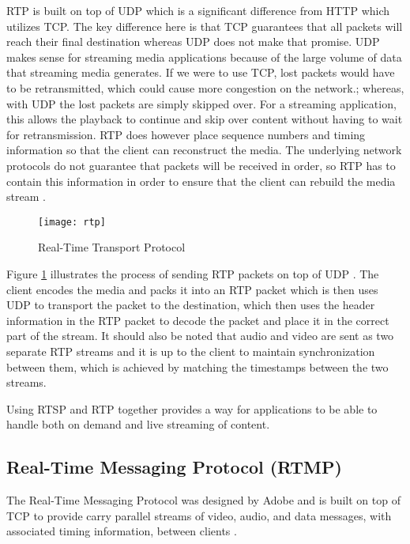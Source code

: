 \documentclass[12pt]{article}
\begin{document}
RTP is built on top of UDP which is a significant difference from HTTP which utilizes TCP.  The key difference here is that TCP guarantees that all packets will reach their final destination whereas UDP does not make that promise.  UDP makes sense for streaming media applications because of the large volume of data that streaming media generates.  If we were to use TCP, lost packets would have to be retransmitted, which could cause more congestion on the network.; whereas, with UDP the lost packets are simply skipped over.  For a streaming application, this allows the playback to continue and skip over content without having to wait for retransmission.  RTP does however place sequence numbers and timing information so that the client can reconstruct the media.  The underlying network protocols do not guarantee that packets will be received in order, so RTP has to contain this information in order to ensure that the client can rebuild the media stream \cite{schulzrinne_casner_frederick_jacobson_2003}.

\begin{figure}[htp]
  \begin{center}
    \texttt{[image: rtp]}
    \caption{Real-Time Transport Protocol}
    \label{fig:rtp}
  \end{center}
\end{figure}

Figure \ref{fig:rtp} illustrates the process of sending RTP packets on top of UDP \cite{zurawski_2005}.  The client encodes the media and packs it into an RTP packet which is then uses UDP to transport the packet to the destination, which then uses the header information in the RTP packet to decode the packet and place it in the correct part of the stream. It should also be noted that audio and video are sent as two separate RTP streams and it is up to the client to maintain synchronization between them, which is achieved by matching the timestamps between the two streams.

Using RTSP and RTP together provides a way for applications to be able to handle both on demand and live streaming of content.

\subsection {Real-Time Messaging Protocol (RTMP)}
The Real-Time Messaging Protocol was designed by Adobe and is built on top of TCP to provide carry parallel streams of video, audio, and data messages, with associated timing information, between clients \cite{rtmp_def}.
\end{document}
